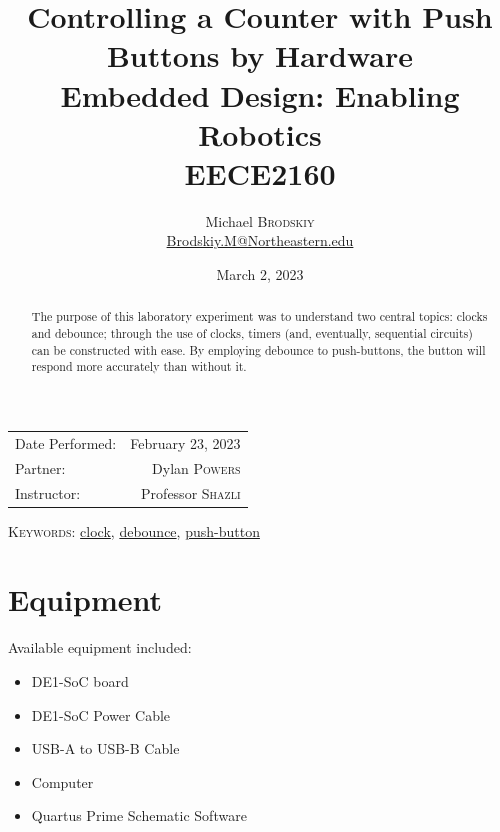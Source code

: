 \documentclass[
	letterpaper, %
	10pt, %
]{CSUniSchoolLabReport}
\title{Controlling a Counter with Push Buttons by Hardware \\ Embedded Design: Enabling Robotics \\ EECE2160} %
\author{Michael \textsc{Brodskiy}\\ \small \href{mailto:Brodskiy.M@Northeastern.edu}{Brodskiy.M@Northeastern.edu}}
\date{March 2, 2023} %
\begin{document}
\maketitle %

\begin{center}
	\begin{tabular}{l r}
		Date Performed: & February 23, 2023 \\ %
        Partner: & Dylan \textsc{Powers} \\ %
		Instructor: & Professor \textsc{Shazli} %
	\end{tabular}
\end{center}

\newpage

\begin{abstract}

  The purpose of this laboratory experiment was to understand two central topics: clocks and debounce; through the use of clocks, timers (and, eventually, sequential circuits) can be constructed with ease. By employing debounce to push-buttons, the button will respond more accurately than without it.

\end{abstract}

\begin{flushleft}

  \textsc{Keywords:} \underline{clock}, \underline{debounce}, \underline{push-button}

\end{flushleft}

\newpage

\section{Equipment}

\hspace{.5 in} Available equipment included:\\

\begin{itemize}

  \item DE1-SoC board

  \item DE1-SoC Power Cable

  \item USB-A to USB-B Cable

  \item Computer

  \item Quartus Prime Schematic Software

\end{itemize}
\end{document}
